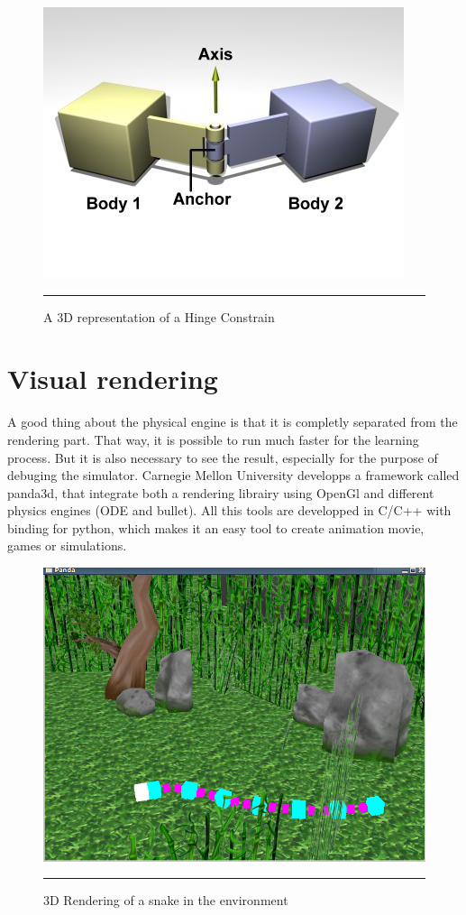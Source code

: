 \begin{figure}[htbp]
    \centering
    \includegraphics{Figures/hinge.jpg}
    \rule{35em}{0.5pt}
    \caption[A Hinge Constraint]{A 3D representation of a Hinge Constrain}
    \label{fig:Hinge}
\end{figure}

\section{Visual rendering}
A good thing about the physical engine is that it is completly separated from the rendering part. That way, it is possible to run much faster for the learning process. But it is also necessary to see the result, especially for the purpose of debuging the simulator. Carnegie Mellon University developps a framework called panda3d, that integrate both a rendering librairy using OpenGl and different physics engines (ODE and bullet). All this tools are developped in C/C++ with binding for python, which makes it an easy tool to create animation movie, games or simulations.


\begin{figure}[htbp]
    \centering
    \includegraphics[scale=0.5]{Figures/snake.png}
    \rule{35em}{0.5pt}
    \caption[Simulated Snake in the environment]{3D Rendering of a snake in the environment}
    \label{fig:Snake}
\end{figure}



